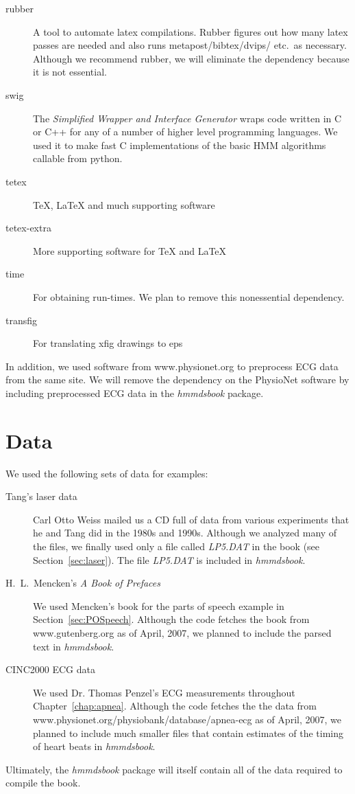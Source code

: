 \begin{description}
  \item[rubber] A tool to automate latex compilations.  Rubber figures
    out how many latex passes are needed and also runs
    metapost/bibtex/dvips/ etc.~as necessary.  Although we recommend
    rubber, we will eliminate the dependency because it is not
    essential.
  \item[swig] The \emph{Simplified Wrapper and Interface Generator}
    wraps code written in C or C++ for any of a number of higher level
    programming languages.  We used it to make fast C implementations
    of the basic HMM algorithms callable from python.
  \item[tetex] TeX, LaTeX and much supporting software
  \item[tetex-extra] More supporting software for TeX and LaTeX
  \item[time] For obtaining run-times.  We plan to remove this
    nonessential dependency.
  \item[transfig] For translating xfig drawings to eps
  \end{description}
  In addition, we used software from www.physionet.org to preprocess
  ECG data from the same site.  We will remove the dependency on the
  PhysioNet software by including preprocessed ECG data in the
  \emph{hmmdsbook} package.

\section{Data}
\label{sec:SWdata}

We used the following sets of data for examples:
\begin{description}
\item[Tang's laser data] Carl Otto Weiss  mailed
  us a CD full of data from various experiments that he and Tang did
  in the 1980s and 1990s.  Although we analyzed many of the files, we
  finally used only a file called \emph{LP5.DAT} in the book (see
  Section~\ref{sec:laser}).  The file \emph{LP5.DAT} is included in
  \emph{hmmdsbook}.
\item[H.~L.~Mencken's \emph{A Book of Prefaces}] We used Mencken's
  book for the parts of speech example in Section~\ref{sec:POSpeech}.
  Although the code fetches the book from www.gutenberg.org as of
  April, 2007, we planned to include the parsed text in
  \emph{hmmdsbook}.
\item[CINC2000 ECG data] We used Dr. Thomas Penzel's ECG measurements
  throughout Chapter~\ref{chap:apnea}.  Although the code fetches the
  the data from\\
  www.physionet.org/physiobank/database/apnea-ecg as of April, 2007,
  we planned to include much smaller files that contain estimates of
  the timing of heart beats in \emph{hmmdsbook}.
\end{description}
Ultimately, the \emph{hmmdsbook} package will itself contain all of
the data required to compile the book.

